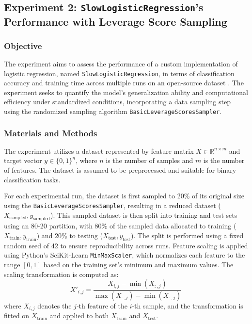 \documentclass{article}
\theoremstyle{plain}
\theoremstyle{definition}
\theoremstyle{remark}
\begin{document}
\subsection{Experiment 2: \texttt{SlowLogisticRegression}'s Performance with Leverage Score Sampling}

\subsubsection{Objective}

The experiment aims to assess the performance of a custom implementation of logistic regression, named \texttt{SlowLogisticRegression}, in terms of classification accuracy and training time across multiple runs on an open-source dataset \cite{breastcancer}. The experiment seeks to quantify the model's generalization ability and computational efficiency under standardized conditions, incorporating a data sampling step using the randomized sampling algorithm \texttt{BasicLeverageScoresSampler}.


\subsubsection{Materials and Methods}

The experiment utilizes a dataset represented by feature matrix $ X \in \mathbb{R}^{n \times m} $ and target vector $ y \in \{0, 1\}^n $, where $ n $ is the number of samples and $ m $ is the number of features. The dataset is assumed to be preprocessed and suitable for binary classification tasks.

For each experimental run, the dataset is first sampled to 20\% of its original size using the \texttt{BasicLeverageScoresSampler}, resulting in a reduced dataset ($ X_{\text{sampled}}, y_{\text{sampled}} $). This sampled dataset is then split into training and test sets using an 80-20 partition, with 80\% of the sampled data allocated to training ($ X_{\text{train}}, y_{\text{train}} $) and 20\% to testing ($ X_{\text{test}}, y_{\text{test}} $). The split is performed using a fixed random seed of 42 to ensure reproducibility across runs. Feature scaling is applied using Python's SciKit-Learn \texttt{MinMaxScaler}, which normalizes each feature to the range $[0, 1]$ based on the training set's minimum and maximum values. The scaling transformation is computed as:
\[
X'_{i,j} = \frac{X_{i,j} - \min(X_{:,j})}{\max(X_{:,j}) - \min(X_{:,j})}
\]
where $ X_{i,j} $ denotes the $ j $-th feature of the $ i $-th sample, and the transformation is fitted on $ X_{\text{train}} $ and applied to both $ X_{\text{train}} $ and $ X_{\text{test}} $.
\end{document}

